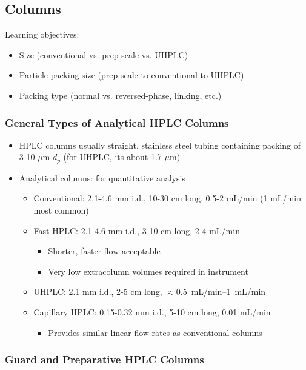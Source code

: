 \documentclass[a4paper, 12pt]{article}
\begin{document}
\subsection{Columns}

Learning objectives:
\begin{itemize}
	\item Size (conventional vs. prep-scale vs. UHPLC)
	\item Particle packing size (prep-scale to conventional to UHPLC)
	\item Packing type (normal vs. reversed-phase, linking, etc.)
\end{itemize}

\subsubsection{General Types of Analytical HPLC Columns}

\begin{itemize}
	\item HPLC columns usually straight, stainless steel tubing containing packing of 3-10 $\mu{}$m $d_p$ (for UHPLC, its about 1.7 $\mu{}$m)
	\item Analytical columns: for quantitative analysis
	\begin{itemize}
		\item Conventional: 2.1-4.6 mm i.d., 10-30 cm long, 0.5-2 mL/min (1 mL/min most common)
		\item Fast HPLC: 2.1-4.6 mm i.d., 3-10 cm long, 2-4 mL/min
		\begin{itemize}
			\item Shorter, faster flow acceptable
			\item Very low extracolumn volumes required in instrument
		\end{itemize}
		\item UHPLC: 2.1 mm i.d., 2-5 cm long, $\approx$\SIrange{0.5}{1}{mL/min}
		\item Capillary HPLC: 0.15-0.32 mm i.d., 5-10 cm long, 0.01 mL/min
		\begin{itemize}
			\item Provides similar linear flow rates as conventional columns
		\end{itemize}
	\end{itemize}
\end{itemize}

\subsubsection{Guard and Preparative HPLC Columns}
\end{document}
